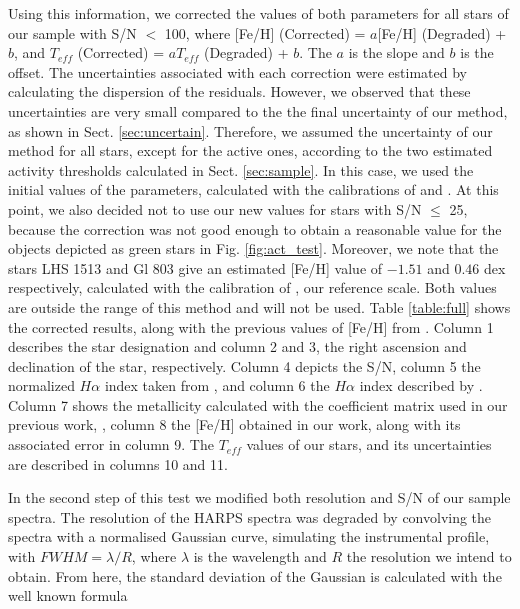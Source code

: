 \documentclass{aa}
\begin{document}
Using this information, we corrected the values of both parameters for all stars of our sample with S/N $<$ 100, where [Fe/H] (Corrected) = $a$[Fe/H] (Degraded) + $b$, and $T_{eff}$ (Corrected) = $aT_{eff}$ (Degraded) + $b$. The $a$ is the slope and $b$ is the offset. The uncertainties associated with each correction were estimated by calculating the dispersion of the residuals. However, we observed that these uncertainties are very small compared to the the final uncertainty of our method, as shown in Sect. \ref{sec:uncertain}. Therefore, we assumed the uncertainty of our method for all stars, except for the active ones, according to the two estimated activity thresholds calculated in Sect. \ref{sec:sample}. In this case, we used the initial values of the parameters, calculated with the calibrations of \citet{Neves-2012} and \citet{Casagrande-2008}. At this point, we also decided not to use our new values for stars with S/N $\leq$ 25, because the correction was not good enough to obtain a reasonable value for the objects depicted as green stars in Fig. \ref{fig:act_test}. Moreover, we note that the stars LHS 1513 and Gl 803 give an estimated [Fe/H] value of $-1.51$ and $0.46$ dex respectively, calculated with the calibration of \citet{Neves-2012}, our reference scale. Both values are outside the range of this method and will not be used. Table \ref{table:full} shows the corrected results, along with the previous values of [Fe/H] from \citet{Neves-2013}. Column 1 describes the star designation and column 2 and 3, the right ascension and declination of the star, respectively. Column 4 depicts the S/N, column 5 the normalized $H\alpha$ index taken from \citet{Reiners-2012}, and column 6 the $H\alpha$ index described by \citet{Gomes_da_Silva-2011}. Column 7 shows the metallicity calculated with the coefficient matrix used in our previous work, \citet{Neves-2013}, column 8 the [Fe/H] obtained in our work, along with its associated error in column 9. The $T_{eff}$ values of our stars, and its uncertainties are described in columns 10 and 11.    %

\addtocounter{table}{1}


In the second step of this test we modified both resolution and S/N of our sample spectra. The resolution of the HARPS spectra was degraded by convolving the spectra with a normalised Gaussian curve, simulating the instrumental profile, with $FWHM = \lambda/R$, where $\lambda$ is the wavelength and $R$ the resolution we intend to obtain. %
From here, the standard deviation of the Gaussian is calculated with the well known formula 
\end{document}
